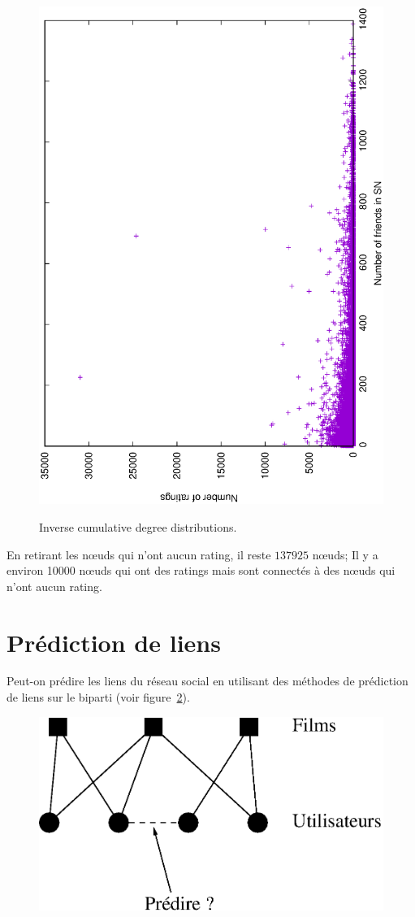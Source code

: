 \documentclass[a4paper, 11pt]{article}
\begin{document}
	\begin{figure}
		\centering
		\includegraphics[angle=-90, width=0.9\linewidth]{img/degree-sn-vs-ratings}
		\label{fig:degrees-ccdfs}
		\caption{Inverse cumulative degree distributions.}
	\end{figure}
	
	
	En retirant les n\oe uds qui n'ont aucun rating, il reste $137925$ n\oe uds; Il y a environ 10000 n\oe uds qui ont des ratings mais sont connectés à des n\oe uds qui n'ont aucun rating.
	
	\clearpage
	
	\section{Prédiction de liens}

	Peut-on prédire les liens du réseau social en utilisant des méthodes de prédiction de liens sur le biparti (voir figure~\ref{fig:linkpred-bip-rs}).
	
	\begin{figure}
		\begin{center}
			\includegraphics[width=0.5\linewidth]{img/linkpred-bip-rs}
			\label{fig:linkpred-bip-rs}
			\caption{}
		\end{center}
	\end{figure}
	
\end{document}
